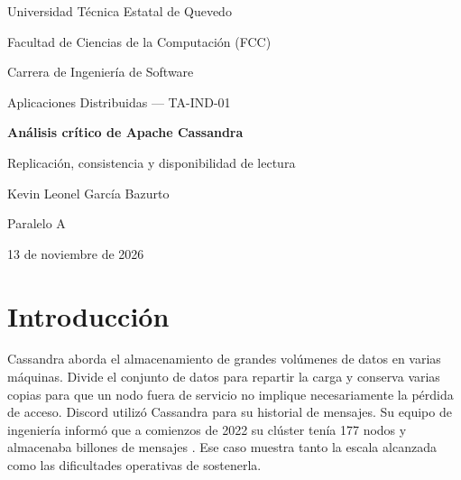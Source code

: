 \documentclass[12pt,a4paper]{article}
\begin{document}
\begin{titlepage}\centering
{\Large Universidad Técnica Estatal de Quevedo\par}
Facultad de Ciencias de la Computación (FCC)\par
Carrera de Ingeniería de Software\par
\vfill
Aplicaciones Distribuidas — TA-IND-01\par
\vspace{1cm}
{\LARGE\bfseries Análisis crítico de Apache Cassandra\par}
Replicación, consistencia y disponibilidad de lectura\par
\vfill
Kevin Leonel García Bazurto\par
Paralelo A\par
13 de noviembre de 2026\par{}
\end{titlepage}
\begin{abstract}
Este informe analiza cómo Apache Cassandra distribuye los datos y mantiene disponible una consulta cuando dejan de responder algunos nodos. El análisis describe el papel del coordinador, la replicación por centro de datos y los niveles de consistencia. Se realizó una prueba con Cassandra 5.0.9 en Docker, tres nodos y un factor de replicación de tres. Después de insertar un registro con ALL, se repitió la misma consulta con ONE y QUORUM mientras se detenían dos nodos de forma sucesiva. Con los tres nodos activos, ambos niveles devolvieron el registro. Con una única réplica disponible, ONE completó la lectura y QUORUM devolvió un error de disponibilidad porque requería dos respuestas. La comparación documental con CockroachDB examina la distribución de datos, la coordinación de lecturas, la replicación, los fallos y la recuperación. El resultado del laboratorio muestra que la disponibilidad depende del nivel de consistencia seleccionado y del estado de las réplicas de cada dato. La prueba se limita a lecturas de un registro previamente escrito y permite identificar qué condiciones habría que estudiar para evaluar escrituras, latencia o particiones de red.
\end{abstract}
\section{Introducción}
Cassandra aborda el almacenamiento de grandes volúmenes de datos en varias máquinas. Divide el conjunto de datos para repartir la carga y conserva varias copias para que un nodo fuera de servicio no implique necesariamente la pérdida de acceso. Discord utilizó Cassandra para su historial de mensajes. Su equipo de ingeniería informó que a comienzos de 2022 su clúster tenía 177 nodos y almacenaba billones de mensajes \cite{discord2023}. Ese caso muestra tanto la escala alcanzada como las dificultades operativas de sostenerla.
\end{document}
